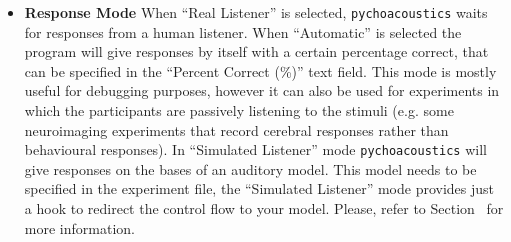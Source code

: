 \begin{itemize}
\item \textbf{Response Mode} When ``Real Listener'' is selected, \texttt{pychoacoustics} waits for responses
from a human listener. When ``Automatic'' is selected the program will give responses by itself with a certain
percentage correct, that can be specified in the ``Percent Correct (\%)'' text field. This mode is mostly
useful for debugging purposes, however it can also be used for experiments in which the
participants are passively listening to the stimuli (e.g. some neuroimaging experiments that record cerebral responses
rather than behavioural responses). In ``Simulated Listener'' mode \texttt{pychoacoustics} will give responses
on the bases of an auditory model. This model needs to be specified in the experiment file, the ``Simulated Listener'' mode
provides just a hook to redirect the control flow to your model.
Please, refer to Section~\label{sec:response_mode} for more information.


\end{itemize}

